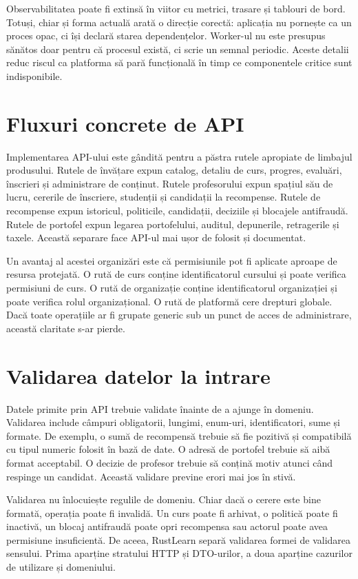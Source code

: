 Observabilitatea poate fi extinsă în viitor cu metrici, trasare și tablouri de bord. Totuși, chiar și forma actuală arată o direcție corectă: aplicația nu pornește ca un proces opac, ci își declară starea dependențelor. Worker-ul nu este presupus sănătos doar pentru că procesul există, ci scrie un semnal periodic. Aceste detalii reduc riscul ca platforma să pară funcțională în timp ce componentele critice sunt indisponibile.

\section{Fluxuri concrete de API}
Implementarea API-ului este gândită pentru a păstra rutele apropiate de limbajul produsului. Rutele de învățare expun catalog, detaliu de curs, progres, evaluări, înscrieri și administrare de conținut. Rutele profesorului expun spațiul său de lucru, cererile de înscriere, studenții și candidații la recompense. Rutele de recompense expun istoricul, politicile, candidații, deciziile și blocajele antifraudă. Rutele de portofel expun legarea portofelului, auditul, depunerile, retragerile și taxele. Această separare face API-ul mai ușor de folosit și documentat.

Un avantaj al acestei organizări este că permisiunile pot fi aplicate aproape de resursa protejată. O rută de curs conține identificatorul cursului și poate verifica permisiuni de curs. O rută de organizație conține identificatorul organizației și poate verifica rolul organizațional. O rută de platformă cere drepturi globale. Dacă toate operațiile ar fi grupate generic sub un punct de acces de administrare, această claritate s-ar pierde.

\section{Validarea datelor la intrare}
Datele primite prin API trebuie validate înainte de a ajunge în domeniu. Validarea include câmpuri obligatorii, lungimi, enum-uri, identificatori, sume și formate. De exemplu, o sumă de recompensă trebuie să fie pozitivă și compatibilă cu tipul numeric folosit în bază de date. O adresă de portofel trebuie să aibă format acceptabil. O decizie de profesor trebuie să conțină motiv atunci când respinge un candidat. Această validare previne erori mai jos în stivă.

Validarea nu înlocuiește regulile de domeniu. Chiar dacă o cerere este bine formată, operația poate fi invalidă. Un curs poate fi arhivat, o politică poate fi inactivă, un blocaj antifraudă poate opri recompensa sau actorul poate avea permisiune insuficientă. De aceea, RustLearn separă validarea formei de validarea sensului. Prima aparține stratului HTTP și DTO-urilor, a doua aparține cazurilor de utilizare și domeniului.

